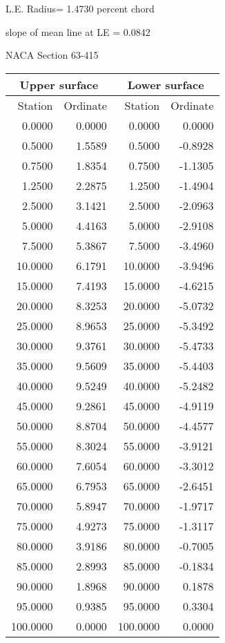 \documentclass[11pt]{book}
\begin{document}
L.E. Radius=  1.4730 percent chord


 slope of mean line at LE =  0.0842
 \newpage
  \label{s63-415}
 \begin{Large}
 NACA Section 63-415
 \end{Large}
  
 \vspace{8mm}
 \begin{tabular}{|r|r|r|r|} \hline 
 \multicolumn{2}{|c|}{Upper surface} & \multicolumn{2}{|c|}{Lower surface} \\
 \hline
 Station & Ordinate & Station & Ordinate \\
 \hline
0.0000 & 0.0000 & 0.0000 & 0.0000 \\
0.5000 & 1.5589 & 0.5000 & -0.8928 \\
0.7500 & 1.8354 & 0.7500 & -1.1305 \\
1.2500 & 2.2875 & 1.2500 & -1.4904 \\
2.5000 & 3.1421 & 2.5000 & -2.0963 \\
5.0000 & 4.4163 & 5.0000 & -2.9108 \\
7.5000 & 5.3867 & 7.5000 & -3.4960 \\
10.0000 & 6.1791 & 10.0000 & -3.9496 \\
15.0000 & 7.4193 & 15.0000 & -4.6215 \\
20.0000 & 8.3253 & 20.0000 & -5.0732 \\
25.0000 & 8.9653 & 25.0000 & -5.3492 \\
30.0000 & 9.3761 & 30.0000 & -5.4733 \\
35.0000 & 9.5609 & 35.0000 & -5.4403 \\
40.0000 & 9.5249 & 40.0000 & -5.2482 \\
45.0000 & 9.2861 & 45.0000 & -4.9119 \\
50.0000 & 8.8704 & 50.0000 & -4.4577 \\
55.0000 & 8.3024 & 55.0000 & -3.9121 \\
60.0000 & 7.6054 & 60.0000 & -3.3012 \\
65.0000 & 6.7953 & 65.0000 & -2.6451 \\
70.0000 & 5.8947 & 70.0000 & -1.9717 \\
75.0000 & 4.9273 & 75.0000 & -1.3117 \\
80.0000 & 3.9186 & 80.0000 & -0.7005 \\
85.0000 & 2.8993 & 85.0000 & -0.1834 \\
90.0000 & 1.8968 & 90.0000 & 0.1878 \\
95.0000 & 0.9385 & 95.0000 & 0.3304 \\
100.0000 & 0.0000 & 100.0000 & 0.0000 \\
 \hline 
 \end{tabular}
\end{document}
